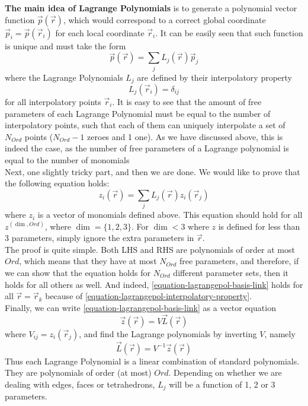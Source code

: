 \noindent
\textbf{The main idea of Lagrange Polynomials} is to generate a polynomial vector function $\vec{p}(\vec{r})$, which would correspond to a correct global coordinate $\vec{p}_i = \vec{p}(\vec{r}_i)$ for each local coordinate $\vec{r}_i$. It can be easily seen that such function is unique and must take the form
\begin{equation}
	\vec{p}(\vec{r}) = \sum_j L_j(\vec{r})\vec{p}_j 
\end{equation}
\noindent
where the Lagrange Polynomials $L_j$ are defined by their interpolatory property
\begin{equation}
	\label{equation-lagrangepol-interpolatory-property}
	L_j(\vec{r}_i) = \delta_{ij}
\end{equation}
\noindent
for all interpolatory points $\vec{r}_i$. It is easy to see that the amount of free parameters of each Lagrange Polynomial must be equal to the number of interpolatory points, such that each of them can uniquely interpolate a set of $N_{Ord}$ points ($N_{Ord} - 1$ zeroes and 1 one). As we have discussed above, this is indeed the case, as the number of free parameters of a Lagrange polynomial is equal to the number of monomials \\

\noindent
Next, one slightly tricky part, and then we are done. We would like to prove that the following equation holds:
\begin{equation}
	\label{equation-lagrangepol-basis-link}
	z_i(\vec{r}) = \sum_j L_j(\vec{r}) z_i (\vec{r}_j) 
\end{equation}
\noindent
where $z_i$ is a vector of monomials defined above. This equation should hold for all $z^{(\dim, Ord)}$, where $\dim = \{1,2,3\}$. For $\dim < 3$ where $z$ is defined for less than 3 parameters, simply ignore the extra parameters in $\vec{r}$. \\

\noindent
The proof is quite simple. Both LHS and RHS are polynomials of order at most $Ord$, which means that they have at most $N_{Ord}$ free parameters, and therefore, if we can show that the equation holds for $N_{Ord}$ different parameter sets, then it holds for all others as well. And indeed, \eqref{equation-lagrangepol-basis-link} holds for all $\vec{r} = \vec{r}_k$ because of \eqref{equation-lagrangepol-interpolatory-property}. \\

\noindent
Finally, we can write \eqref{equation-lagrangepol-basis-link} as a vector equation
\begin{equation}
	\vec{z} (\vec{r}) = V \vec{L} (\vec{r})
\end{equation}
\noindent
where $V_{ij} = z_i (\vec{r}_j)$, and find the Lagrange polynomials by inverting $V$, namely
\begin{equation}
	\vec{L} (\vec{r}) = V^{-1} \vec{z} (\vec{r})
\end{equation}
\noindent
Thus each Lagrange Polynomial is a linear combination of standard polynomials. They are polynomials of order (at most) $Ord$. Depending on whether we are dealing with edges, faces or tetrahedrons, $L_j$ will be a function of 1, 2 or 3 parameters.

